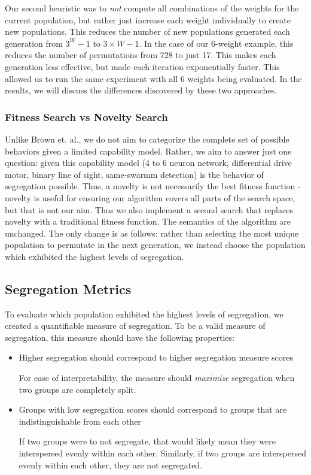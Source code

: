 Our second heuristic was to \emph{not} compute all combinations of the weights for the current population, but rather just increase each weight individually to create new populations. 
This reduces the number of new populations generated each generation from $3^W - 1$ to $3 \times W - 1$. 
In the case of our 6-weight example, this reduces the number of permutations from 728 to just 17. 
This makes each generation less effective, but made each iteration exponentially faster. 
This allowed us to run the same experiment with all 6 weights being evaluated. 
In the results, we will discuss the differences discovered by these two approaches.


\subsubsection{Fitness Search vs Novelty Search}

Unlike Brown et. al., we do not aim to categorize the complete set of possible behaviors given a limited capability model. 
Rather, we aim to answer just one question: given this capability model (4 to 6 neuron network, differential drive motor, binary line of sight, same-swarmm detection) is the behavior of segregation possible. 
Thus, a novelty is not necessarily the best fitness function - novelty is useful for ensuring our algorithm covers all parts of the search space, but that is not our aim. 
Thus we also implement a second search that replaces novelty with a traditional fitness function.
The semantics of the algorithm are unchanged. 
The only change is as follows: rather than selecting the most unique population to permutate in the next generation, we instead choose the population which exhibited the highest levels of segregation.


\subsection{Segregation Metrics}

To evaluate which population exhibited the highest levels of segregation, we created a quantifiable measure of segregation. 
To be a valid measure of segregation, this measure should have the following properties: 
\begin{itemize}
    \item Higher segregation should correspond to higher segregation measure scores

        For ease of interpretability, the measure should \emph{maximize} segregation when two groups are completely split.

    \item Groups with low segregation scores should correspond to groups that are indistinguishable from each other

        If two groups were to not segregate, that would likely mean they were interspersed evenly within each other. 
        Similarly, if two groups are interspersed evenly within each other, they are not segregated. 

\end{itemize}

